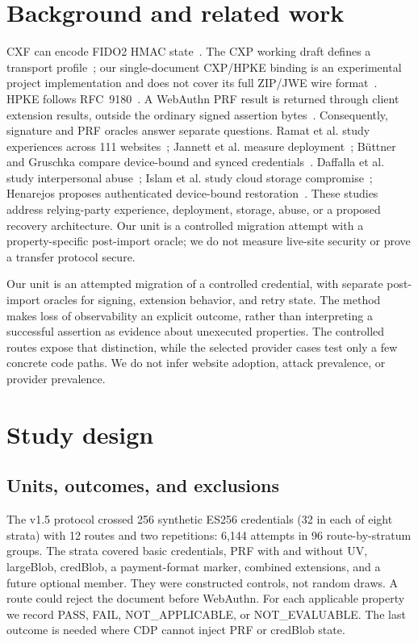 \documentclass[letterpaper,twocolumn,10pt]{article}
\begin{document}
\section{Background and related work}
CXF can encode FIDO2 HMAC state~\cite{cxf}. The CXP working draft defines a
transport profile~\cite{cxp}; our single-document CXP/HPKE binding is an
experimental project implementation and does not cover its full ZIP/JWE
wire format~\cite{jwe}. HPKE follows RFC~9180~\cite{hpke}. A WebAuthn PRF result is
returned through client extension results, outside the ordinary signed
assertion bytes~\cite{webauthn}. Consequently, signature and PRF oracles
answer separate questions. Ramat et al. study experiences across 111
websites~\cite{ramat}; Jannett et al. measure deployment~\cite{jannett};
B\"uttner and Gruschka compare device-bound and synced
credentials~\cite{buttner}. Daffalla et al. study interpersonal
abuse~\cite{daffalla}; Islam et al. study cloud storage
compromise~\cite{islam}; Henarejos proposes authenticated device-bound
restoration~\cite{henarejos}. These studies address relying-party experience,
deployment, storage, abuse, or a proposed recovery architecture. Our unit is a
controlled migration attempt with a property-specific post-import oracle;
we do not measure live-site security or prove a transfer protocol secure.

Our unit is an attempted migration of a controlled credential, with
separate post-import oracles for signing, extension behavior, and retry
state. The method makes loss of observability an explicit outcome, rather
than interpreting a successful assertion as evidence about unexecuted
properties. The controlled routes expose that distinction, while the
selected provider cases test only a few concrete code paths. We do not
infer website adoption, attack prevalence, or provider prevalence.

\section{Study design}
\subsection{Units, outcomes, and exclusions}
The v1.5 protocol crossed 256 synthetic ES256 credentials (32 in each of
eight strata) with 12 routes and two
repetitions: 6,144 attempts in 96 route-by-stratum groups. The strata
covered basic credentials, PRF with and without UV, largeBlob, credBlob,
a payment-format marker, combined extensions, and a future optional
member. They were constructed controls, not random draws. A route
could reject the document before WebAuthn. For each applicable property we
record PASS, FAIL, NOT\_APPLICABLE, or NOT\_EVALUABLE. The last outcome is
needed where CDP cannot inject PRF or credBlob state.
\end{document}

